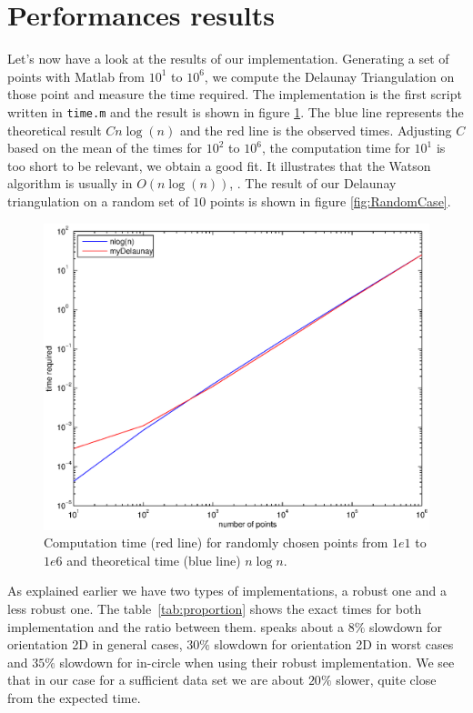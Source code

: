 \section{Performances results}

Let's now have a look at the results of our implementation. Generating a set of points with Matlab from $10^1$ to $10^6$, we compute the Delaunay Triangulation on those point and measure the time required. The implementation is the first script written in \texttt{time.m} and the result is shown in figure \ref{fig:timeRandom}. The blue line represents the theoretical result $C n\log(n)$ and the red line is the observed times. Adjusting $C$ based on the mean of the times for $10^2$ to $10^6$, the computation time for $10^1$ is too short to be relevant, we obtain a good fit. It illustrates that the Watson algorithm is usually in $O(n\log(n))$, \cite{de2000computational}. The result of our Delaunay triangulation on a random set of $10$ points is shown in figure \ref{fig:RandomCase}. 

\begin{figure}
\centering 
\includegraphics[scale=0.5]{images/timeRandom.eps}
\caption{Computation time (red line) for randomly chosen points from $1e1$ to $1e6$ and theoretical time (blue line) $n\log n$.}
\label{fig:timeRandom}
\end{figure}

As explained earlier we have two types of implementations, a robust one and a less robust one. The table~\ref{tab:proportion} shows the exact times for both implementation and the ratio between them. \cite{shewchuk1996robust} speaks about a $8 \%$ slowdown for orientation 2D in general cases, $30\%$ slowdown for orientation 2D in worst cases and $35\%$ slowdown for in-circle when using their robust implementation. We see that in our case for a sufficient data set we are about $20\%$ slower, quite close from the expected time. 

